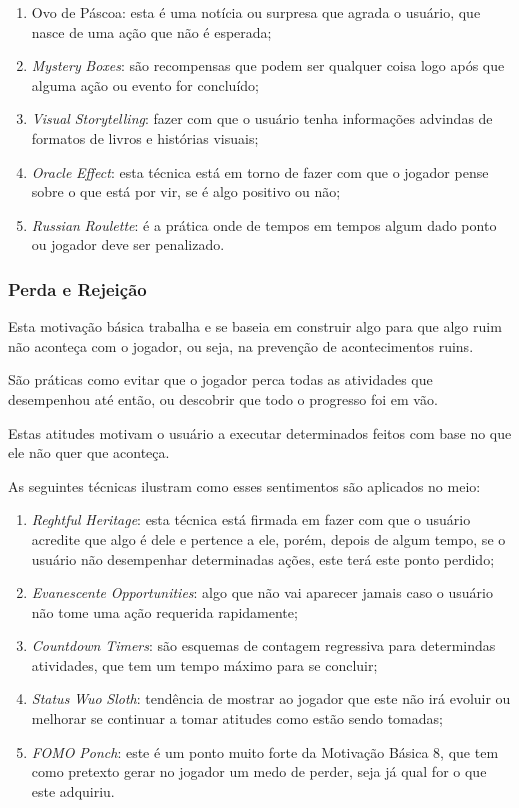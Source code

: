 \begin{enumerate}
    \item Ovo de Páscoa: esta é uma notícia ou surpresa que agrada o usuário,
        que nasce de uma ação que não é esperada;
    \item \textit{Mystery} \textit{Boxes}: são recompensas que podem ser qualquer coisa
        logo após que alguma ação ou evento for concluído;
    \item \textit{Visual} \textit{Storytelling}: fazer com que o usuário tenha informações
        advindas de formatos de livros e histórias
        visuais;
    \item \textit{Oracle} \textit{Effect}: esta técnica está em torno de fazer com que o
        jogador pense sobre o que está por vir, se é algo positivo ou não;
    \item \textit{Russian} \textit{Roulette}: é a prática onde de tempos em tempos algum dado ponto
        ou jogador deve ser penalizado.
\end{enumerate}

\subsubsection{Perda e Rejeição}
\label{sub:perdaerejeicao}
Esta motivação básica trabalha e se baseia em construir algo para que algo ruim não
aconteça com o jogador, ou seja, na prevenção de acontecimentos ruins.

São práticas como evitar que o jogador perca todas as atividades que desempenhou
até então, ou descobrir que todo o progresso foi em vão.

Estas atitudes motivam o usuário a executar determinados feitos com base no que
ele não quer que aconteça.

As seguintes técnicas ilustram como esses sentimentos são aplicados no meio:

\begin{enumerate}
    \item \textit{Reghtful} \textit{Heritage}: esta técnica está firmada em fazer com que o usuário
        acredite que algo é dele e pertence a ele, porém, depois de algum tempo,
        se o usuário não desempenhar determinadas ações, este terá este ponto
        perdido;
    \item \textit{Evanescente} \textit{Opportunities}: algo que não vai aparecer jamais
        caso o usuário não tome uma ação requerida rapidamente;
    \item \textit{Countdown} \textit{Timers}: são esquemas de contagem regressiva para determindas
        atividades, que tem um tempo máximo para se concluir;
    \item \textit{Status} \textit{Wuo} \textit{Sloth}: tendência de mostrar ao jogador que este não irá evoluir ou melhorar se continuar
        a tomar atitudes como estão sendo tomadas;
    \item \textit{FOMO} \textit{Ponch}: este é um ponto muito forte da Motivação Básica 8, que tem como
        pretexto gerar no jogador um medo de perder, seja já qual for o que
        este adquiriu.
\end{enumerate}


